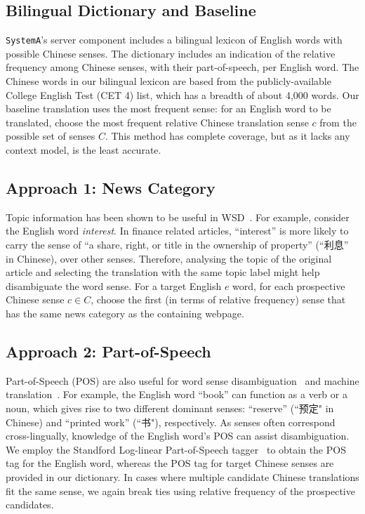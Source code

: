 \begin{CJK}{UTF8}{gbsn}
\subsection{Bilingual Dictionary and Baseline}

{\tt SystemA}'s server component includes a bilingual lexicon of
English words with possible Chinese senses.  The dictionary includes
an indication of the relative frequency among Chinese senses, with
their part-of-speech, per English word. The Chinese words in our
bilingual lexicon are based from the publicly-available College
English Test (CET 4) list, which has a breadth of about 4,000 words.
Our baseline translation uses the most frequent sense: for an English
word to be translated, choose the most frequent relative Chinese
translation sense $c$ from the possible set of senses $C$. This method
has complete coverage, but as it lacks any context model, is the least
accurate.

\subsection{Approach 1: News Category}
Topic information has been shown to be useful in
WSD~\cite{Boyd-Graber2007}.  For example, consider the English word
\textit{interest}. In finance related articles, ``interest'' is more
likely to carry the sense of ``a share, right, or title in the
ownership of property'' (``利息'' in Chinese), over other senses.
Therefore, analysing the topic of the original article and selecting
the translation with the same topic label might help disambiguate the
word sense. For a target English $e$ word, for each prospective Chinese
sense $c \in C$, choose the first (in terms of relative frequency)
sense that has the same news category as the containing webpage.

\subsection{Approach 2: Part-of-Speech}
Part-of-Speech (POS) are also useful for word sense
disambiguation~\cite{Wilks1998} and machine
translation~\cite{Toutanova2002,Ueffing2003}.  For example, the
English word ``book'' can function as a verb or a noun, which gives
rise to two different dominant senses: ``reserve'' (``预定" in
Chinese) and ``printed work'' (``书"), respectively. As senses often
correspond cross-lingually, knowledge of the English word's POS can
assist disambiguation.  We employ the Standford Log-linear
Part-of-Speech tagger~\cite{Toutanova2003} to obtain the POS tag for
the English word, whereas the POS tag for target Chinese senses are
provided in our dictionary.  In cases where multiple candidate Chinese
translations fit the same sense, we again break ties using relative
frequency of the prospective candidates.


\end{CJK}
